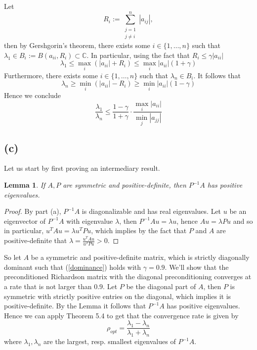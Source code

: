 \documentclass{article}
\newcommand{\C}{\mathbb{C}}
\newtheorem*{lemma}{Lemma}
\begin{document}
Let
\begin{equation*}
R_i := \sum_{\substack{j = 1 \\ j \neq i}}^n |a_{ij}|,
\end{equation*}
then by Gershgorin's theorem,
there exists some $i \in \{1, \dots, n\}$
such that $\lambda_1 \in B_i := B(a_{ii}, R_i) \subset \C$.
In particular, using the fact that $R_i \leq \gamma |a_{ii}|$
\begin{equation*}
	\lambda_1 \leq \max_i(|a_{ii}| + R_i) \leq 
	\max_i|a_{ii}|(1 + \gamma)
\end{equation*}
Furthermore, there exists some $i \in \{1, \dots, n\}$
such that $\lambda_n \in B_i$. It follows that
\begin{equation*}
	\lambda_n \geq \min_i(|a_{ii}| - R_i) \geq 
	\min_i|a_{ii}|(1 - \gamma)
\end{equation*}
Hence we conclude
\begin{equation*}
	\frac{\lambda_1}{\lambda_n} \leq \frac{1 - \gamma}{1 + \gamma}
	\cdot \frac{\max_i|a_{ii}|}{\min_j|a_{jj}|}
\end{equation*}

\subsection*{(c)}

Let us start by first proving an intermediary result.

\begin{lemma}
	If $A, P$ are symmetric and positive-definite, then
	$P^{-1}A$ has positive eigenvalues.
\end{lemma}
\begin{proof}
	By part (a), $P^{-1}A$ is diagonalizable and has real
	eigenvalues. Let $u$ be an eigenvector of $P^{-1}A$ with
	eigenvalue $\lambda$, then $P^{-1}Au = \lambda u$,
	hence $Au = \lambda Pu$ and so in particular,
	$u^TAu = \lambda u^TPu$, which implies by the fact
	that $P$ and $A$ are positive-definite that
	$\lambda = \frac{u^TAu}{u^TPu} > 0$.
\end{proof}

So let $A$ be a symmetric and positive-definite matrix,
which is strictly diagonally dominant such that (\ref{dominance})
holds with $\gamma = 0.9$. We'll show that the preconditioned
Richardson matrix with the diagonal preconditioning converges at a
rate that is not larger than $0.9$. Let $P$ be the diagonal part of
$A$, then $P$ is symmetric with strictly positive entries on the
diagonal, which implies it is positive-definite. By the Lemma it 
follows that $P^{-1}A$ has positive eigenvalues. Hence we can apply
Theorem 5.4 to get that the convergence rate is given by
\begin{equation*}
	\rho_{opt} = \frac{\lambda_1 - \lambda_n}{\lambda_1 + \lambda_n}
\end{equation*}
where $\lambda_1, \lambda_n$ are the largest, resp. smallest
eigenvalues of $P^{-1}A$.
\end{document}
